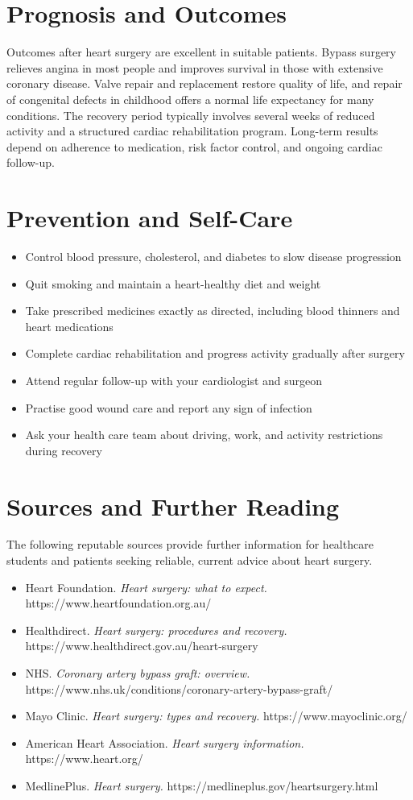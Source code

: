 \section*{Prognosis and Outcomes}
Outcomes after heart surgery are excellent in suitable patients. Bypass surgery relieves angina in most people and improves survival in those with extensive coronary disease. Valve repair and replacement restore quality of life, and repair of congenital defects in childhood offers a normal life expectancy for many conditions. The recovery period typically involves several weeks of reduced activity and a structured cardiac rehabilitation program. Long-term results depend on adherence to medication, risk factor control, and ongoing cardiac follow-up.

\section*{Prevention and Self-Care}
\begin{itemize}
    \item Control blood pressure, cholesterol, and diabetes to slow disease progression
    \item Quit smoking and maintain a heart-healthy diet and weight
    \item Take prescribed medicines exactly as directed, including blood thinners and heart medications
    \item Complete cardiac rehabilitation and progress activity gradually after surgery
    \item Attend regular follow-up with your cardiologist and surgeon
    \item Practise good wound care and report any sign of infection
    \item Ask your health care team about driving, work, and activity restrictions during recovery
\end{itemize}

\section*{Sources and Further Reading}
The following reputable sources provide further information for healthcare students and patients seeking reliable, current advice about heart surgery.

\begin{itemize}
    \item Heart Foundation. \textit{Heart surgery: what to expect.} https://www.heartfoundation.org.au/
    \item Healthdirect. \textit{Heart surgery: procedures and recovery.} https://www.healthdirect.gov.au/heart-surgery
    \item NHS. \textit{Coronary artery bypass graft: overview.} https://www.nhs.uk/conditions/coronary-artery-bypass-graft/
    \item Mayo Clinic. \textit{Heart surgery: types and recovery.} https://www.mayoclinic.org/
    \item American Heart Association. \textit{Heart surgery information.} https://www.heart.org/
    \item MedlinePlus. \textit{Heart surgery.} https://medlineplus.gov/heartsurgery.html
\end{itemize}
